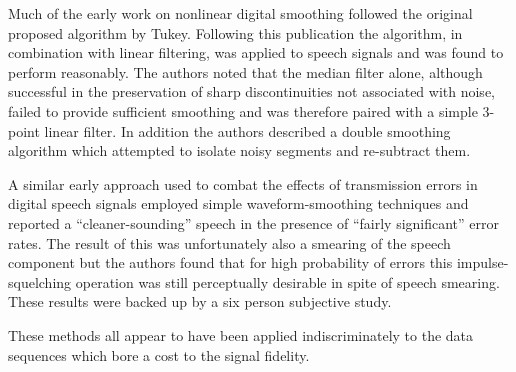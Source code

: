Much of the early work on nonlinear digital smoothing followed the original proposed algorithm by Tukey\cite{Tukey1974}. Following this publication the algorithm, in combination with linear filtering, was applied to speech signals and was found to perform reasonably\cite{Rabiner1975}. The authors noted that the median filter alone, although successful in the preservation of sharp discontinuities not associated with noise, failed to provide sufficient smoothing and was therefore paired with a simple 3-point linear filter. In addition the authors described a double smoothing algorithm which attempted to isolate noisy segments and re-subtract them.


%
%
A similar early approach used to combat the effects of transmission errors in digital speech signals employed simple waveform-smoothing techniques and reported a ``cleaner-sounding'' speech in the presence of ``fairly significant'' error rates\cite{Jayant1976}. The result of this was unfortunately also a smearing of the speech component but the authors found that for high probability of errors this impulse-squelching operation was still perceptually desirable in spite of speech smearing. These results were backed up by a six person subjective study.

\cite{Rabiner1975}
%
%

These methods all appear to have been applied indiscriminately to the data sequences which bore a cost to the signal fidelity.


